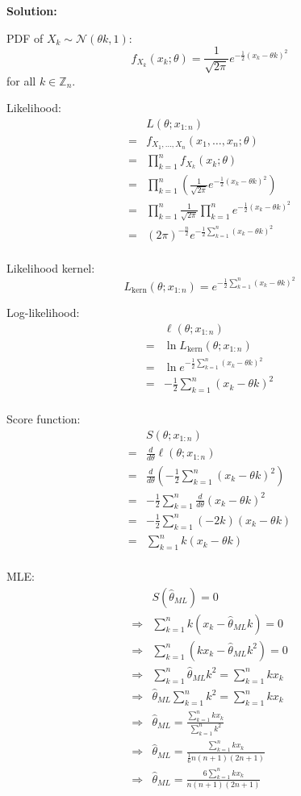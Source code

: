 \documentclass{article}
\begin{document}
\textbf{Solution:}
\begin{ssolution}
PDF of \(X_k \sim \mathcal{N}(\theta k,1)\):
\[f_{X_k}(x_k;\theta) = \frac{1}{\sqrt{2\pi}} e^{-\frac12(x_k-\theta k)^2}\]
for all \(k\in\mathbb{Z}_n\).

Likelihood:
\begin{align*}
	& L(\theta;x_{1:n}) \\
	=& f_{X_1,\ldots,X_n}(x_1,\ldots,x_n;\theta) \\
	=& \prod_{k=1}^n f_{X_k}(x_k;\theta) \\
	=& \prod_{k=1}^n \left(\frac{1}{\sqrt{2\pi}} e^{-\frac12(x_k-\theta k)^2}\right) \\
	=& \prod_{k=1}^n \frac{1}{\sqrt{2\pi}} \prod_{k=1}^n e^{-\frac12(x_k-\theta k)^2} \\
	=& (2\pi)^{-\frac n2} e^{-\frac12\sum_{k=1}^n(x_k-\theta k)^2} \\
\end{align*}

Likelihood kernel:
\[L_{\text{kern}}(\theta;x_{1:n}) = e^{-\frac12\sum_{k=1}^n(x_k-\theta k)^2}\]

Log-likelihood:
\begin{align*}
	& \ell(\theta;x_{1:n}) \\
	=& \ln L_{\text{kern}}(\theta;x_{1:n}) \\
	=& \ln e^{-\frac12\sum_{k=1}^n(x_k-\theta k)^2} \\
	=& -\frac12\sum_{k=1}^n(x_k-\theta k)^2 \\
\end{align*}

Score function:
\begin{align*}
	& S(\theta;x_{1:n}) \\
	=& \frac{d}{d\theta} \ell(\theta;x_{1:n}) \\
	=& \frac{d}{d\theta} \left(-\frac12\sum_{k=1}^n(x_k-\theta k)^2\right) \\
	=& -\frac12 \sum_{k=1}^n\frac{d}{d\theta}(x_k-\theta k)^2 \\
	=& -\frac12 \sum_{k=1}^n(-2k)(x_k-\theta k) \\
	=& \sum_{k=1}^n k(x_k-\theta k) \\
\end{align*}

MLE:
\begin{align*}
	& S(\hat{\theta}_{ML}) = 0 \\
	\Rightarrow& \sum_{k=1}^n k(x_k-\hat{\theta}_{ML} k) = 0 \\
	\Rightarrow& \sum_{k=1}^n (kx_k-\hat{\theta}_{ML} k^2) = 0 \\
	\Rightarrow& \sum_{k=1}^n \hat{\theta}_{ML} k^2 = \sum_{k=1}^n kx_k \\
	\Rightarrow& \hat{\theta}_{ML}\sum_{k=1}^n k^2 = \sum_{k=1}^n kx_k \\
	\Rightarrow& \hat{\theta}_{ML} = \frac{\sum_{k=1}^n kx_k}{\sum_{k=1}^n k^2} \\
	\Rightarrow& \hat{\theta}_{ML} = \frac{\sum_{k=1}^n kx_k}{\frac16 n(n+1)(2n+1)} \\
	\Rightarrow& \hat{\theta}_{ML} = \frac{6\sum_{k=1}^n kx_k}{n(n+1)(2n+1)} \\
\end{align*}


\end{ssolution}
\end{document}
